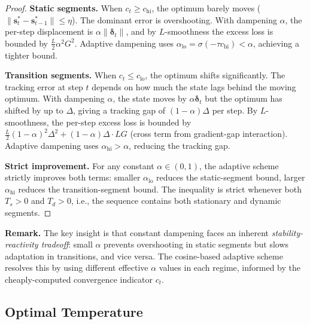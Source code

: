 \begin{proof}
\textbf{Static segments.} When $c_t \geq c_{\text{hi}}$, the optimum barely moves ($\|\mathbf{s}^*_t - \mathbf{s}^*_{t-1}\| \leq \eta$). The dominant error is overshooting. With dampening $\alpha$, the per-step displacement is $\alpha \|\boldsymbol{\delta}_t\|$, and by $L$-smoothness the excess loss is bounded by $\frac{L}{2}\alpha^2 G^2$. Adaptive dampening uses $\alpha_{\text{lo}} = \sigma(-\tau c_{\text{hi}}) < \alpha$, achieving a tighter bound.

\textbf{Transition segments.} When $c_t \leq c_{\text{lo}}$, the optimum shifts significantly. The tracking error at step $t$ depends on how much the state lags behind the moving optimum. With dampening $\alpha$, the state moves by $\alpha \boldsymbol{\delta}_t$ but the optimum has shifted by up to $\Delta$, giving a tracking gap of $(1-\alpha)\Delta$ per step. By $L$-smoothness, the per-step excess loss is bounded by $\frac{L}{2}(1-\alpha)^2\Delta^2 + (1-\alpha)\Delta \cdot LG$ (cross term from gradient-gap interaction). Adaptive dampening uses $\alpha_{\text{hi}} > \alpha$, reducing the tracking gap.

\textbf{Strict improvement.} For any constant $\alpha \in (0,1)$, the adaptive scheme strictly improves both terms: smaller $\alpha_{\text{lo}}$ reduces the static-segment bound, larger $\alpha_{\text{hi}}$ reduces the transition-segment bound. The inequality is strict whenever both $T_s > 0$ and $T_d > 0$, i.e., the sequence contains both stationary and dynamic segments.
\end{proof}

\textbf{Remark.} The key insight is that constant dampening faces an inherent \emph{stability-reactivity tradeoff}: small $\alpha$ prevents overshooting in static segments but slows adaptation in transitions, and vice versa. The cosine-based adaptive scheme resolves this by using different effective $\alpha$ values in each regime, informed by the cheaply-computed convergence indicator $c_t$.

\subsection{Optimal Temperature}

